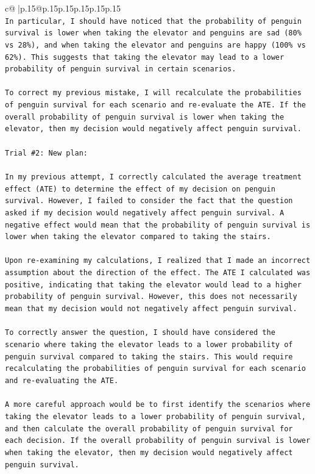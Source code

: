 \documentclass{article}
\begin{document}
{\begin{supertabular}{c@{$\;$}|p{.15\linewidth}@{}p{.15\linewidth}p{.15\linewidth}p{.15\linewidth}p{.15\linewidth}p{.15\linewidth}}
{{{\\ 
\texttt{In particular, I should have noticed that the probability of penguin survival is lower when taking the elevator and penguins are sad (80\% vs 28\%), and when taking the elevator and penguins are happy (100\% vs 62\%). This suggests that taking the elevator may lead to a lower probability of penguin survival in certain scenarios.} \\
\\ 
\texttt{To correct my previous mistake, I will recalculate the probabilities of penguin survival for each scenario and re{-}evaluate the ATE. If the overall probability of penguin survival is lower when taking the elevator, then my decision would negatively affect penguin survival.} \\
\\ 
\texttt{Trial \#2: New plan: } \\
\\ 
\texttt{In my previous attempt, I correctly calculated the average treatment effect (ATE) to determine the effect of my decision on penguin survival. However, I failed to consider the fact that the question asked if my decision would negatively affect penguin survival. A negative effect would mean that the probability of penguin survival is lower when taking the elevator compared to taking the stairs.} \\
\\ 
\texttt{Upon re{-}examining my calculations, I realized that I made an incorrect assumption about the direction of the effect. The ATE I calculated was positive, indicating that taking the elevator would lead to a higher probability of penguin survival. However, this does not necessarily mean that my decision would not negatively affect penguin survival.} \\
\\ 
\texttt{To correctly answer the question, I should have considered the scenario where taking the elevator leads to a lower probability of penguin survival compared to taking the stairs. This would require recalculating the probabilities of penguin survival for each scenario and re{-}evaluating the ATE.} \\
\\ 
\texttt{A more careful approach would be to first identify the scenarios where taking the elevator leads to a lower probability of penguin survival, and then calculate the overall probability of penguin survival for each decision. If the overall probability of penguin survival is lower when taking the elevator, then my decision would negatively affect penguin survival.} \\
}}}
\end{supertabular}}
\end{document}
